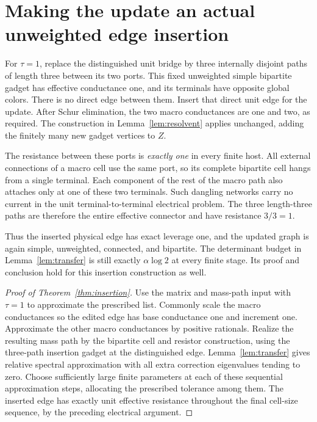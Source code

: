 \documentclass[11pt]{article}
\begin{document}
\section{Making the update an actual unweighted edge insertion}
For $\tau=1$, replace the distinguished unit bridge by three internally
disjoint paths of length three between its two ports. This fixed
unweighted simple bipartite gadget has effective conductance one,
and its terminals have opposite global colors. There is no direct
edge between them. Insert that direct unit edge for the update.
After Schur elimination, the two macro conductances are one and two,
as required. The construction in Lemma~\ref{lem:resolvent} applies
unchanged, adding the finitely many new gadget vertices to $Z$.

The resistance between these ports is \emph{exactly one} in every
finite host. All external connections of a macro cell use the same
port, so its complete bipartite cell hangs from a single terminal.
Each component of the rest of the macro path also attaches only at
one of these two terminals. Such dangling networks carry no current
in the unit terminal-to-terminal electrical problem. The three
length-three paths are therefore the entire effective connector and
have resistance $3/3=1$.

Thus the inserted physical edge has exact leverage one, and the
updated graph is again simple, unweighted, connected, and bipartite.
The determinant budget in Lemma~\ref{lem:transfer} is still exactly
$\alpha\log2$ at every finite stage. Its proof and conclusion hold
for this insertion construction as well.

\begin{proof}[Proof of Theorem~\ref{thm:insertion}]
Use the matrix and mass-path input with $\tau=1$ to approximate the
prescribed list. Commonly scale the macro conductances so the edited
edge has base conductance one and increment one. Approximate the
other macro conductances by positive rationals. Realize the resulting
mass path by the bipartite cell and resistor construction, using the
three-path insertion gadget at the distinguished edge.
Lemma~\ref{lem:transfer} gives relative spectral approximation with
all extra correction eigenvalues tending to zero. Choose sufficiently
large finite parameters at each of these sequential approximation
steps, allocating the prescribed tolerance among them. The inserted
edge has exactly unit effective resistance throughout the final
cell-size sequence, by the preceding electrical argument.
\end{proof}
\end{document}
